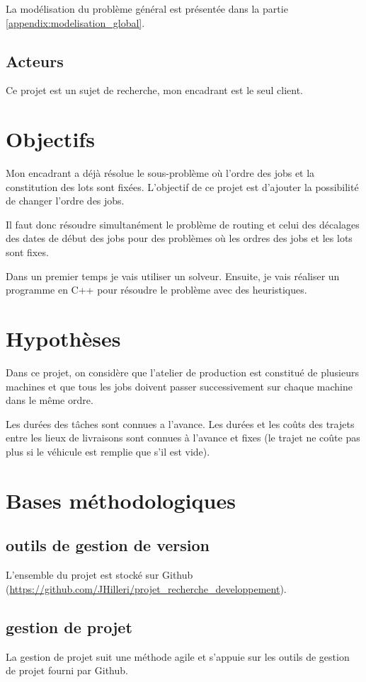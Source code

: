 La modélisation du problème général est présentée dans la partie \autoref{appendix:modelisation_global}.

\subsection{Acteurs}
Ce projet est un sujet de recherche, mon encadrant est le seul client.

\section{Objectifs}
Mon encadrant a déjà résolue le sous-problème où l'ordre des jobs et la constitution des lots sont fixées.
L'objectif de ce projet est d'ajouter la possibilité de changer l'ordre des jobs.

Il faut donc résoudre simultanément le problème de routing et celui des décalages des dates de début des jobs 
    pour des problèmes où les ordres des jobs et les lots sont fixes.

Dans un premier temps je vais utiliser un solveur.
Ensuite, je vais réaliser un programme en C++ pour résoudre le problème avec des heuristiques.

\section{Hypothèses}
Dans ce projet, on considère que l'atelier de production est constitué de plusieurs machines 
    et que tous les jobs doivent passer successivement sur chaque machine dans le même ordre.

Les durées des tâches sont connues a l'avance.
Les durées et les coûts des trajets entre les lieux de livraisons sont connues à l'avance 
    et fixes (le trajet ne coûte pas plus si le véhicule est remplie que s'il est vide).


\section{Bases méthodologiques}
\subsection{outils de gestion de version}
L'ensemble du projet est stocké sur Github (\url{https://github.com/JHilleri/projet_recherche_developpement}).

\subsection{gestion de projet}
La gestion de projet suit une méthode agile et s'appuie sur les outils de gestion de projet fourni par Github.

